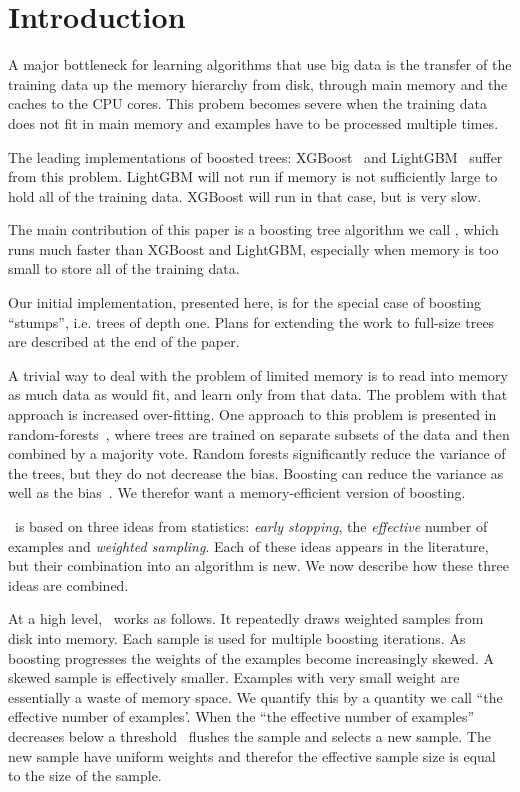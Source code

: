 \section{Introduction}\label{sec:intro}
A major bottleneck for learning algorithms that use big data is the
transfer of the training data up the memory hierarchy from disk,
through main memory and the caches to the CPU cores. This probem
becomes severe when the training data does not fit in main memory and
examples have to be processed multiple times.

The leading implementations of boosted trees: XGBoost~\cite{chen_xgboost:_2016} and
LightGBM~\cite{ke_lightgbm:_2017} suffer from this problem. LightGBM
will not run if memory is not sufficiently large to hold all of the
training data. XGBoost will run in that case, but is very slow.

The main contribution of this paper is a boosting tree algorithm we
call \Sparrow, which runs much faster than XGBoost and LightGBM,
especially when memory is too small to store all of the training data.

Our initial implementation, presented here, is for the special case of
boosting ``stumps'', i.e. trees of depth one. Plans for extending the
work to full-size trees are described at the end of the paper.

A trivial way to deal with the problem of limited memory is to read
into memory as much data as would fit, and learn only from that data.
The problem with that approach is increased over-fitting. One approach
to this problem is presented in random-forests~\cite{},
where trees are trained on separate subsets of the data and then
combined by a majority vote. Random forests significantly reduce the
variance of the trees, but they do not decrease the bias. Boosting can
reduce the variance as well as the bias~\cite{Boosting-the-margin}. We
therefor want a memory-efficient version of boosting.

\Sparrow\ is based on three ideas from statistics: {\em early stopping},
the {\em effective} number of examples and {\em weighted
  sampling}. Each of these ideas appears in the literature, but their
combination into an algorithm is new. We now describe how these three
ideas are combined.

At a high level, \Sparrow\ works as follows. It repeatedly draws
weighted samples from disk into memory. Each sample is
used for multiple boosting iterations. As boosting progresses the
weights of the examples become increasingly skewed. A skewed sample is
effectively smaller. Examples with very small weight are essentially a
waste of memory space. We quantify this by a quantity we call ``the
effective number of examples'. When the  ``the effective number
of examples'' decreases below a threshold \Sparrow\ flushes the sample
and selects a new sample. The new sample have uniform weights and
therefor the effective sample size is equal to the size of the sample.

